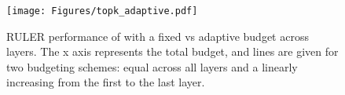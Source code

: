 \begin{figure}
    \centering
    \texttt{[image: Figures/topk\_adaptive.pdf]}
    \caption{RULER performance of \topk with a fixed vs adaptive \kk budget across layers. The x axis represents the total \kk budget, and lines are given for two \kk budgeting schemes: equal \kk across all layers and a linearly increasing \kk from the first to the last layer.}
    \label{fig:topk_adaptive}
\end{figure}